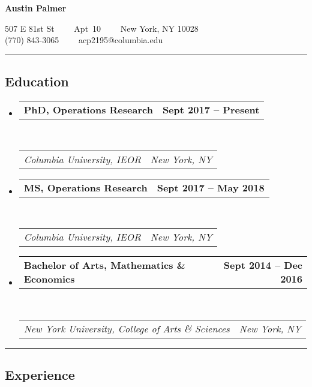 \documentclass[11pt,letterpaper]{article}
\makeatletter
\newcommand{\headerrow}[2]
{\begin{tabular*}{\linewidth}{l@{\extracolsep{\fill}}r}
	#1 &
	#2 \\
\end{tabular*}}
\makeatother
\begin{document}
\begin{center}
{\LARGE \textbf{Austin Palmer}}
\vspace{0.2em}


507 E 81st St\ \ \textbullet
\ \ Apt\ 10\ \ \textbullet
\ \ New York, NY 10028
\\
(770) 843-3065\ \ \textbullet
\ \ acp2195@columbia.edu
\end{center}

\hrule
\vspace{-0.4em}

\subsection*{Education}

\begin{itemize}
	\parskip=0.1em

    \item[] 

	\headerrow
		{\textbf{PhD, Operations Research}}
		{\textbf{Sept 2017 -- Present}}
	\\
	\headerrow
		{\emph{Columbia University, IEOR}}
		{\emph{New York, NY}}

    \item[]
    \headerrow
        {\textbf{MS, Operations Research}}
        {\textbf{Sept 2017 -- May 2018}}
    \\
    \headerrow
        {\emph{Columbia University, IEOR}}
        {\emph{New York, NY}}

    \item[] 
	\headerrow
        {\textbf{Bachelor of Arts, Mathematics \& Economics}}
		{\textbf{Sept 2014 -- Dec 2016}}
	\\
	\headerrow
        {\emph{New York University, College of Arts \& Sciences}}
		{\emph{New York, NY}}


\end{itemize}

\hrule
\vspace{-0.4em}

\subsection*{Experience}
\end{document}
